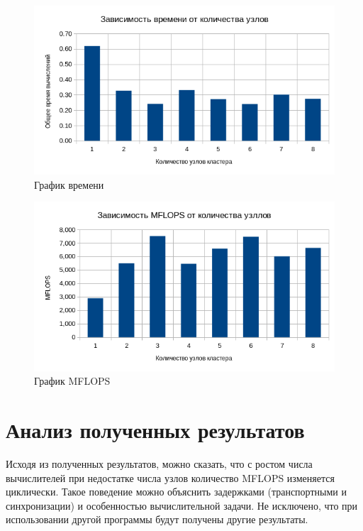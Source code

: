 \begin{figure}[H]
	\centering
	\includegraphics[width=\linewidth]{4-01}
	\caption{График времени}
	\label{plot/01}
\end{figure}


\begin{figure}[H]
	\centering
	\includegraphics[width=\linewidth]{4-02}
	\caption{График MFLOPS}
	\label{plot/02}
\end{figure}


\section{Анализ полученных результатов}
Исходя из полученных результатов, можно сказать, что с ростом числа вычислителей при недостатке числа узлов количество MFLOPS изменяется циклически. Такое поведение можно объяснить задержками (транспортными и синхронизации) и особенностью вычислительной задачи. Не исключено, что при использовании другой программы будут получены другие результаты.





